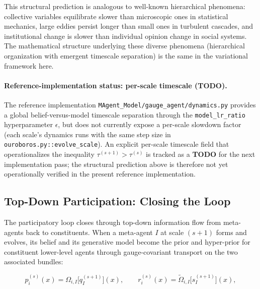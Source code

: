 \documentclass[11pt]{article}
\begin{document}
This structural prediction is analogous to well-known hierarchical phenomena: collective variables equilibrate slower than microscopic ones in statistical mechanics, large eddies persist longer than small ones in turbulent cascades, and institutional change is slower than individual opinion change in social systems. The mathematical structure underlying these diverse phenomena (hierarchical organization with emergent timescale separation) is the same in the variational framework here.

\paragraph{Reference-implementation status: per-scale timescale (\textbf{TODO}).}
The reference implementation \texttt{MAgent\_Model/gauge\_agent/dynamics.py} provides a global belief-versus-model timescale separation through the \texttt{model\_lr\_ratio} hyperparameter $\epsilon$, but does not currently expose a per-scale slowdown factor (each scale's dynamics runs with the same step size in \texttt{ouroboros.py::evolve\_scale}). An explicit per-scale timescale field that operationalizes the inequality $\tau^{(s+1)} > \tau^{(s)}$ is tracked as a \textbf{TODO} for the next implementation pass; the structural prediction above is therefore not yet operationally verified in the present reference implementation.

\subsection{Top-Down Participation: Closing the Loop}

The participatory loop closes through top-down information flow from meta-agents back to constituents. When a meta-agent $I$ at scale $(s+1)$ forms and evolves, its belief and its generative model become the prior and hyper-prior for constituent lower-level agents through gauge-covariant transport on the two associated bundles:

\begin{equation}
p_i^{(s)}(x) = \Omega_{i,I}\big[q_I^{(s+1)}\big](x),
\qquad
r_i^{(s)}(x) = \tilde\Omega_{i,I}\big[s_I^{(s+1)}\big](x),
\label{eq:topdown_priors}
\end{equation}
\end{document}
